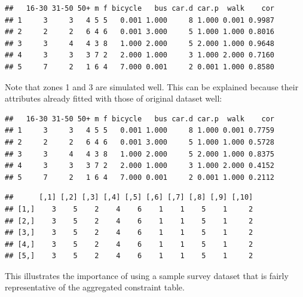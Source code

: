 \begin{Shaded}
\begin{Highlighting}[]
\NormalTok{:}
    \NormalTok{(}\NormalTok{(}\NormalTok{(all.msim[i, }\NormalTok{:}\NormalTok{])), USd.agg3[i, }
        \NormalTok{])}
\NormalTok{\}}
\end{Highlighting}
\end{Shaded}
\begin{verbatim}
##   16-30 31-50 50+ m f bicycle   bus car.d car.p  walk    cor
## 1     3     3   4 5 5   0.001 1.000     8 1.000 0.001 0.9987
## 2     2     2   6 4 6   0.001 3.000     5 1.000 1.000 0.8016
## 3     3     4   4 3 8   1.000 2.000     5 2.000 1.000 0.9648
## 4     3     3   3 7 2   2.000 1.000     3 1.000 2.000 0.7160
## 5     7     2   1 6 4   7.000 0.001     2 0.001 1.000 0.8580
\end{verbatim}
Note that zones 1 and 3 are simulated well. This can be explained
because their attributes already fitted with those of original dataset
well:

\begin{Shaded}
\begin{Highlighting}[]
\NormalTok{:}
    \NormalTok{(}\NormalTok{(}\NormalTok{(all.msim[i, }\NormalTok{:}\NormalTok{])), USd.agg}\NormalTok{[i, }
        \NormalTok{])}
\NormalTok{\}}
\end{Highlighting}
\end{Shaded}
\begin{verbatim}
##   16-30 31-50 50+ m f bicycle   bus car.d car.p  walk    cor
## 1     3     3   4 5 5   0.001 1.000     8 1.000 0.001 0.7759
## 2     2     2   6 4 6   0.001 3.000     5 1.000 1.000 0.5728
## 3     3     4   4 3 8   1.000 2.000     5 2.000 1.000 0.8375
## 4     3     3   3 7 2   2.000 1.000     3 1.000 2.000 0.4152
## 5     7     2   1 6 4   7.000 0.001     2 0.001 1.000 0.2112
\end{verbatim}
\begin{Shaded}
\begin{Highlighting}[]
\end{Highlighting}
\end{Shaded}
\begin{verbatim}
##      [,1] [,2] [,3] [,4] [,5] [,6] [,7] [,8] [,9] [,10]
## [1,]    3    5    2    4    6    1    1    5    1     2
## [2,]    3    5    2    4    6    1    1    5    1     2
## [3,]    3    5    2    4    6    1    1    5    1     2
## [4,]    3    5    2    4    6    1    1    5    1     2
## [5,]    3    5    2    4    6    1    1    5    1     2
\end{verbatim}
This illustrates the importance of using a sample survey dataset that is
fairly representative of the aggregated constraint table.

